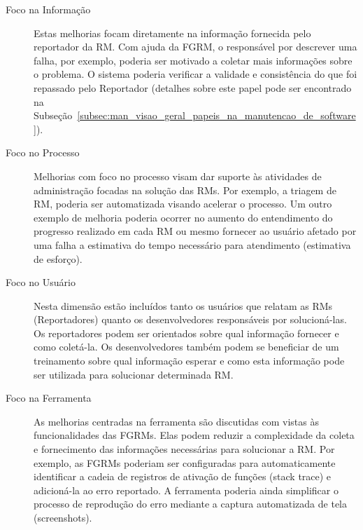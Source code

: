 \begin{description}
	\item[Foco na Informação] Estas melhorias focam diretamente na informação
		fornecida pelo reportador da RM\@. Com ajuda da FGRM, o responsável por
		descrever uma falha, por exemplo, poderia ser motivado a coletar mais
		informações sobre o problema. O sistema poderia verificar a validade e
		consistência do que foi repassado pelo Reportador (detalhes sobre este
		papel pode ser encontrado na
		Subseção~\ref{subsec:man_visao_geral_papeis_na_manutencao_de_software}).
	\item[Foco no Processo] Melhorias com foco no processo visam dar suporte às
		atividades de administração focadas na solução das RMs. Por exemplo, a
		triagem de RM, poderia ser automatizada visando acelerar o processo. Um
		outro exemplo de melhoria poderia ocorrer no aumento do entendimento do
		progresso realizado em cada RM ou mesmo fornecer ao usuário afetado por
		uma falha a estimativa do tempo necessário para atendimento (estimativa
		de esforço).
	\item[Foco no Usuário] Nesta dimensão estão incluídos tanto os usuários que
		relatam as RMs (Reportadores) quanto os desenvolvedores responsáveis por
        solucioná-las. Os reportadores podem ser orientados sobre qual
        informação fornecer e como coletá-la. Os desenvolvedores também podem se
        beneficiar de um treinamento sobre qual informação esperar e como esta
        informação pode ser utilizada para solucionar determinada RM\@.
	\item[Foco na Ferramenta] As melhorias centradas na ferramenta são
		discutidas com vistas às funcionalidades das FGRMs\@. Elas podem reduzir
		a complexidade da coleta e fornecimento das informações necessárias para
		solucionar a RM\@. Por exemplo, as FGRMs poderiam ser configuradas para
		automaticamente identificar a cadeia de registros de ativação de funções
		(stack trace) e adicioná-la ao erro reportado. A ferramenta poderia
		ainda simplificar o processo de reprodução do erro mediante a captura
		automatizada de tela (screenshots).
\end{description}


